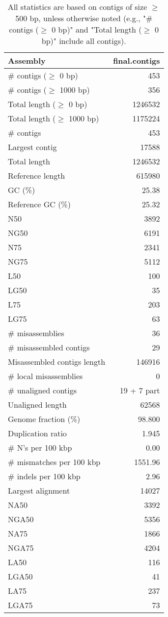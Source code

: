 \documentclass[12pt,a4paper]{article}
\begin{document}
\begin{table}[ht]
\begin{center}
\caption{All statistics are based on contigs of size $\geq$ 500 bp, unless otherwise noted (e.g., "\# contigs ($\geq$ 0 bp)" and "Total length ($\geq$ 0 bp)" include all contigs).}
\begin{tabular}{|l*{1}{|r}|}
\hline
Assembly & final.contigs \\ \hline
\# contigs ($\geq$ 0 bp) & 453 \\ \hline
\# contigs ($\geq$ 1000 bp) & 356 \\ \hline
Total length ($\geq$ 0 bp) & 1246532 \\ \hline
Total length ($\geq$ 1000 bp) & 1175224 \\ \hline
\# contigs & 453 \\ \hline
Largest contig & 17588 \\ \hline
Total length & 1246532 \\ \hline
Reference length & 615980 \\ \hline
GC (\%) & 25.38 \\ \hline
Reference GC (\%) & 25.32 \\ \hline
N50 & 3892 \\ \hline
NG50 & 6191 \\ \hline
N75 & 2341 \\ \hline
NG75 & 5112 \\ \hline
L50 & 100 \\ \hline
LG50 & 35 \\ \hline
L75 & 203 \\ \hline
LG75 & 63 \\ \hline
\# misassemblies & 36 \\ \hline
\# misassembled contigs & 29 \\ \hline
Misassembled contigs length & 146916 \\ \hline
\# local misassemblies & 0 \\ \hline
\# unaligned contigs & 19 + 7 part \\ \hline
Unaligned length & 62568 \\ \hline
Genome fraction (\%) & 98.800 \\ \hline
Duplication ratio & 1.945 \\ \hline
\# N's per 100 kbp & 0.00 \\ \hline
\# mismatches per 100 kbp & 1551.96 \\ \hline
\# indels per 100 kbp & 2.96 \\ \hline
Largest alignment & 14027 \\ \hline
NA50 & 3392 \\ \hline
NGA50 & 5356 \\ \hline
NA75 & 1866 \\ \hline
NGA75 & 4204 \\ \hline
LA50 & 116 \\ \hline
LGA50 & 41 \\ \hline
LA75 & 237 \\ \hline
LGA75 & 73 \\ \hline
\end{tabular}
\end{center}
\end{table}
\end{document}
